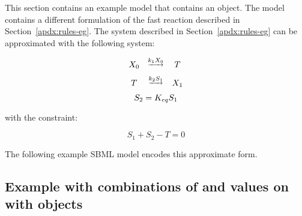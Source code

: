 This section contains an example model that contains an
\AlgebraicRule object.  The model contains a different
formulation of the fast reaction described in
Section~\ref{apdx:rules-eg}.  The system described in
Section~\ref{apdx:rules-eg} can be approximated with the following
system:
\begin{linenomath}
\begin{equation*}
  \begin{array}{@{}ccc@{}}
    X_0 & \overset{\underrightarrow{k_1 X_0}}{} & T \\[6pt]
    T & \overset{\underrightarrow{k_2 S_1}}{} & X_1
  \end{array}
\end{equation*}
\begin{equation*}
    S_2 = K_{eq} S_1\\[10pt]
\end{equation*}
\end{linenomath}
with the constraint:
\begin{linenomath}
\begin{equation*}
    S_1 + S_2 - T = 0
\end{equation*}
\end{linenomath}

The following example SBML model encodes this approximate form.



\subsection{Example with combinations of
   and  values on 
  with  objects}
\label{sec:constantspecieseg}

